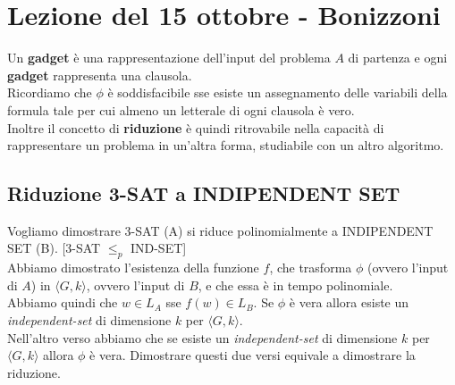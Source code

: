 \section{Lezione del 15 ottobre - Bonizzoni}
Un \textbf{gadget} è una rappresentazione dell'input del problema $A$ di partenza e ogni \textbf{gadget} rappresenta una clausola.\\ Ricordiamo che $\phi$ è soddisfacibile sse esiste un assegnamento delle variabili della formula tale per cui almeno un letterale di ogni clausola è vero. \\
Inoltre il concetto di \textbf{riduzione} è quindi ritrovabile nella capacità di rappresentare un problema in un'altra forma, studiabile con un altro algoritmo.
\subsection{Riduzione 3-SAT a INDIPENDENT SET}
Vogliamo dimostrare 3-SAT (A) si riduce polinomialmente a INDIPENDENT SET (B). [3-SAT $\leq_p$ IND-SET] \\

Abbiamo dimostrato l'esistenza della funzione $f$, che trasforma $\phi$ (ovvero l'input di $A$) in $\langle G, k\rangle$, ovvero l'input di $B$, e che essa è in tempo polinomiale. \\
Abbiamo quindi che $w\in L_A$ sse $f(w)\in L_B$. Se $\phi$ è vera allora esiste un \textit{independent-set} di dimensione $k$ per $\langle G, k\rangle$.\\ Nell'altro verso abbiamo che se esiste un \textit{independent-set} di dimensione $k$ per $\langle G, k\rangle$ allora $\phi$ è vera. Dimostrare questi due versi equivale a dimostrare la riduzione.\\

